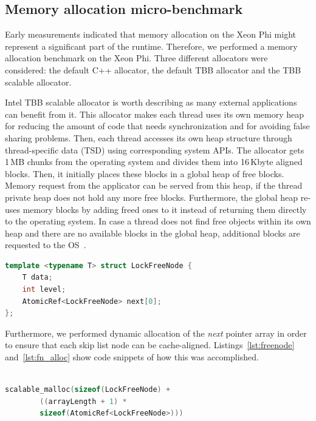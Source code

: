 \subsection{Memory allocation micro-benchmark}
Early measurements indicated that memory allocation on the Xeon Phi might represent a significant part of the runtime.
Therefore, we performed a memory allocation benchmark on the Xeon Phi.
Three different allocators were considered: the default C++ allocator, the default TBB allocator and the TBB scalable allocator. 

Intel TBB scalable allocator is worth describing as many external applications can benefit from it. This allocator makes each thread uses its own memory heap for reducing the amount of code that needs synchronization and for avoiding false sharing problems. Then, each thread accesses its own heap structure through thread-specific data (TSD) using corresponding system APIs. The allocator gets 1\,MB chunks from the operating system and divides them into 16\,Kbyte aligned blocks. Then, it initially places these blocks in a global heap of free blocks. Memory request from the applicator can be served from this heap, if the thread private heap does not hold any more free blocks. Furthermore, the global heap re-uses memory blocks by adding freed ones to it instead of returning them directly to the operating system.
In case a thread does not find free objects within its own heap and there are no available blocks in the global heap, additional blocks are requested to the OS~\cite{_thefoundations,Hudson:2006:MST:1133956.1133967}.  %


\begin{lstlisting}[language=C++,basicstyle=\tt\scriptsize,captionpos=b,caption=Lock free node structure,label=lst:freenode,morekeywords={*, size_t},aboveskip={0.7\baselineskip},belowskip={0.3\baselineskip}]
template <typename T> struct LockFreeNode {
	T data;
	int	level;
	AtomicRef<LockFreeNode>	next[0];
};
\end{lstlisting}

Furthermore, we performed dynamic allocation of the {\em next} pointer array in order to ensure that each skip list node can be cache-aligned. Listings~\ref{lst:freenode} and~\ref{lst:fn_alloc} show code snippets of how this was accomplished.
\begin{lstlisting}[language=C++,basicstyle=\tt\scriptsize,captionpos=b,caption=Memory allocation instruction for array of atomic references,label=lst:fn_alloc, morekeywords={*, size_t},aboveskip={0.3\baselineskip},belowskip={0.3\baselineskip}]

scalable_malloc(sizeof(LockFreeNode) + 
		((arrayLength + 1) * 
		sizeof(AtomicRef<LockFreeNode>)))
\end{lstlisting}

